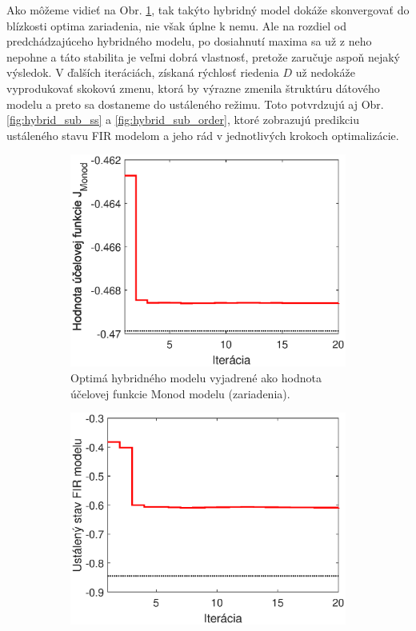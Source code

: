 Ako môžeme vidieť na Obr. \ref{fig:hybrid_sub_costFun}, tak takýto hybridný model dokáže skonvergovať do blízkosti optima zariadenia, nie však úplne k nemu. Ale na rozdiel od  predchádzajúceho hybridného modelu, po dosiahnutí maxima sa už z neho nepohne a táto stabilita je veľmi dobrá vlastnosť, pretože zaručuje aspoň nejaký výsledok. V ďalších iteráciách, získaná rýchlosť riedenia $ D $ už nedokáže vyprodukovať skokovú zmenu, ktorá by výrazne zmenila štruktúru dátového modelu a preto sa dostaneme do ustáleného režimu. Toto potvrdzujú aj Obr. \ref{fig:hybrid_sub_ss} a \ref{fig:hybrid_sub_order}, ktoré zobrazujú predikciu ustáleného stavu FIR modelom a jeho rád v jednotlivých krokoch optimalizácie.
\begin{figure}
	\centering
	\begin{subfigure}[b]{0.49\textwidth}
		\centering
		\includegraphics[width=\linewidth]{images/hybrid_sub_costFun}
		\caption{Optimá hybridného modelu vyjadrené ako hodnota účelovej funkcie Monod modelu (zariadenia).}
		\label{fig:hybrid_sub_costFun}
	\end{subfigure}
	\hfill
	\begin{subfigure}[b]{0.49\textwidth}
		\centering
		\includegraphics[width=\linewidth]{images/hybrid_sub_ss}

\end{subfigure}
\end{figure}
